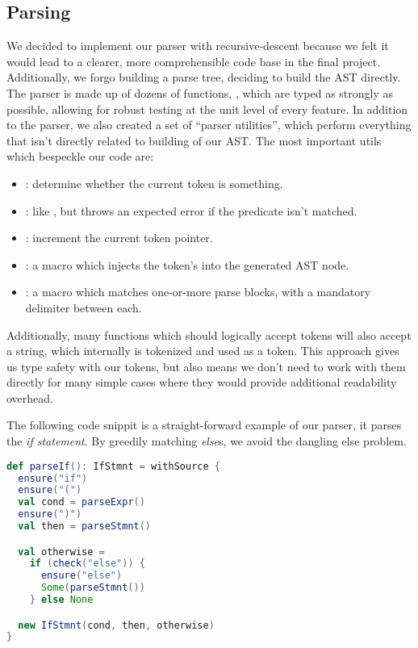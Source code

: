 \documentclass{article}
\begin{document}
\subsection{Parsing}
We decided to implement our parser with recursive-descent because we felt it would lead to a clearer, more
comprehensible code base in the final project. Additionally, we forgo building a parse tree, deciding to build the AST
directly. The parser is made up of dozens of functions, , which are typed as strongly as possible,
allowing for robust testing at the unit level of every feature. In addition to the parser, we also created a set of
``parser utilities'', which perform everything that isn't directly related to building of our AST. The most important
utils which bespeckle our code are:

\begin{itemize}
    \item {}: determine whether the current token is something.
    \item {}: like , but throws an expected error if the predicate isn't matched.
    \item {}: increment the current token pointer.
    \item {}: a macro which injects the token's  into the generated AST node.
    \item {}: a macro which matches one-or-more parse blocks, with a mandatory delimiter between each.
\end{itemize}

Additionally, many functions which should logically accept tokens will also accept a string, which internally is
tokenized and used as a token. This approach gives us type safety with our tokens, but also means we don't need to work
with them directly for many simple cases where they would provide additional readability overhead.

The following code snippit is a straight-forward example of our parser, it parses the \emph{if statement}. By greedily
matching \emph{else}s, we avoid the dangling else problem.

\begin{lstlisting}[language=Scala]
def parseIf(): IfStmnt = withSource {
  ensure("if")
  ensure("(")
  val cond = parseExpr()
  ensure(")")
  val then = parseStmnt()

  val otherwise =
    if (check("else")) {
      ensure("else")
      Some(parseStmnt())
    } else None

  new IfStmnt(cond, then, otherwise)
}
\end{lstlisting}
\end{document}
